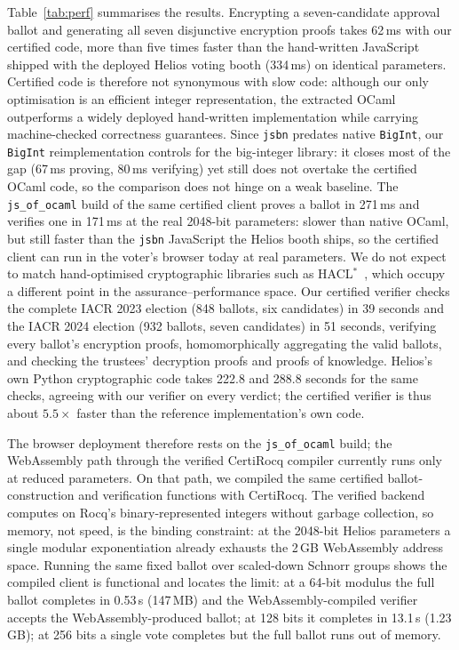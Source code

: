 \documentclass[sigconf,anonymous,review]{acmart}
\begin{document}
Table~\ref{tab:perf} summarises the results. Encrypting a seven-candidate approval ballot and generating all seven disjunctive encryption proofs takes 62\,ms with our certified code, more than five times faster than the hand-written JavaScript shipped with the deployed Helios voting booth (334\,ms) on identical parameters. Certified code is therefore not synonymous with slow code: although our only optimisation is an efficient integer representation, the extracted OCaml outperforms a widely deployed hand-written implementation while carrying machine-checked correctness guarantees. Since \texttt{jsbn} predates native \texttt{BigInt}, our \texttt{BigInt} reimplementation controls for the big-integer library: it closes most of the gap (67\,ms proving, 80\,ms verifying) yet still does not overtake the certified OCaml code, so the comparison does not hinge on a weak baseline. The \texttt{js\_of\_ocaml} build of the same certified client proves a ballot in 271\,ms and verifies one in 171\,ms at the real 2048-bit parameters: slower than native OCaml, but still faster than the \texttt{jsbn} JavaScript the Helios booth ships, so the certified client can run in the voter's browser today at real parameters. We do not expect to match hand-optimised cryptographic libraries such as HACL$^{*}$~\cite{10.1145/3133956.3134043}, which occupy a different point in the assurance--performance space. Our certified verifier checks the complete IACR 2023 election (848 ballots, six candidates) in 39 seconds and the IACR 2024 election (932 ballots, seven candidates) in 51 seconds, verifying every ballot's encryption proofs, homomorphically aggregating the valid ballots, and checking the trustees' decryption proofs and proofs of knowledge. Helios's own Python cryptographic code takes 222.8 and 288.8 seconds for the same checks, agreeing with our verifier on every verdict; the certified verifier is thus about $5.5\times$ faster than the reference implementation's own code.

The browser deployment therefore rests on the \texttt{js\_of\_ocaml} build; the WebAssembly path through the verified CertiRocq compiler currently runs only at reduced parameters. On that path, we compiled the same certified ballot-construction and verification functions with CertiRocq. The verified backend computes on Rocq's binary-represented integers without garbage collection, so memory, not speed, is the binding constraint: at the 2048-bit Helios parameters a single modular exponentiation already exhausts the 2\,GB WebAssembly address space. Running the same fixed ballot over scaled-down Schnorr groups shows the compiled client is functional and locates the limit: at a 64-bit modulus the full ballot completes in 0.53\,s (147\,MB) and the WebAssembly-compiled verifier accepts the WebAssembly-produced ballot; at 128 bits it completes in 13.1\,s (1.23\,GB); at 256 bits a single vote completes but the full ballot runs out of memory. 
\end{document}

